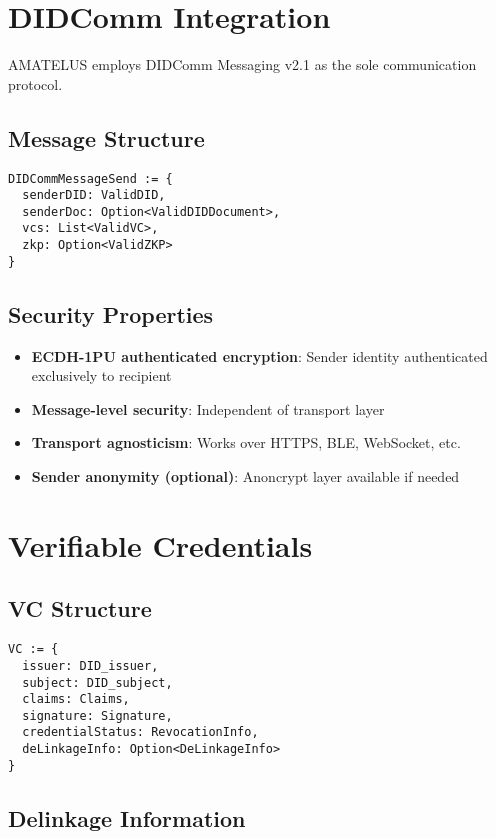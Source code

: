 \section{DIDComm Integration}

AMATELUS employs DIDComm Messaging v2.1 as the sole communication protocol.

\subsection{Message Structure}

\begin{verbatim}
DIDCommMessageSend := {
  senderDID: ValidDID,
  senderDoc: Option<ValidDIDDocument>,
  vcs: List<ValidVC>,
  zkp: Option<ValidZKP>
}
\end{verbatim}

\subsection{Security Properties}

\begin{itemize}
  \item \textbf{ECDH-1PU authenticated encryption}: Sender identity authenticated exclusively to recipient
  \item \textbf{Message-level security}: Independent of transport layer
  \item \textbf{Transport agnosticism}: Works over HTTPS, BLE, WebSocket, etc.
  \item \textbf{Sender anonymity (optional)}: Anoncrypt layer available if needed
\end{itemize}

\section{Verifiable Credentials}

\subsection{VC Structure}

\begin{verbatim}
VC := {
  issuer: DID_issuer,
  subject: DID_subject,
  claims: Claims,
  signature: Signature,
  credentialStatus: RevocationInfo,
  deLinkageInfo: Option<DeLinkageInfo>
}
\end{verbatim}

\subsection{Delinkage Information}


